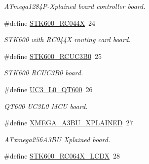 \begin{DoxyCompactItemize}
\begin{DoxyCompactList}\small\item\em A\-Tmega1284\-P-\/\-Xplained board controller board. \end{DoxyCompactList}\item 
\hypertarget{group__group__common__boards_ga53054d452a89f550fcdff65adc167f88}{\#define \hyperlink{group__group__common__boards_ga53054d452a89f550fcdff65adc167f88}{S\-T\-K600\-\_\-\-R\-C044\-X}~24}\label{group__group__common__boards_ga53054d452a89f550fcdff65adc167f88}

\begin{DoxyCompactList}\small\item\em S\-T\-K600 with R\-C044\-X routing card board. \end{DoxyCompactList}\item 
\hypertarget{group__group__common__boards_ga6bdfe50597188fd8a4956c247ecf9fa9}{\#define \hyperlink{group__group__common__boards_ga6bdfe50597188fd8a4956c247ecf9fa9}{S\-T\-K600\-\_\-\-R\-C\-U\-C3\-B0}~25}\label{group__group__common__boards_ga6bdfe50597188fd8a4956c247ecf9fa9}

\begin{DoxyCompactList}\small\item\em S\-T\-K600 R\-C\-U\-C3\-B0 board. \end{DoxyCompactList}\item 
\hypertarget{group__group__common__boards_gae06980d7c2c8a89eab699394bfb52897}{\#define \hyperlink{group__group__common__boards_gae06980d7c2c8a89eab699394bfb52897}{U\-C3\-\_\-\-L0\-\_\-\-Q\-T600}~26}\label{group__group__common__boards_gae06980d7c2c8a89eab699394bfb52897}

\begin{DoxyCompactList}\small\item\em Q\-T600 U\-C3\-L0 M\-C\-U board. \end{DoxyCompactList}\item 
\hypertarget{group__group__common__boards_ga6bc10dae84bde15597ba87e803e6f476}{\#define \hyperlink{group__group__common__boards_ga6bc10dae84bde15597ba87e803e6f476}{X\-M\-E\-G\-A\-\_\-\-A3\-B\-U\-\_\-\-X\-P\-L\-A\-I\-N\-E\-D}~27}\label{group__group__common__boards_ga6bc10dae84bde15597ba87e803e6f476}

\begin{DoxyCompactList}\small\item\em A\-Txmega256\-A3\-B\-U Xplained board. \end{DoxyCompactList}\item 
\hypertarget{group__group__common__boards_gae7749288a3bd2be20b0283233af4df79}{\#define \hyperlink{group__group__common__boards_gae7749288a3bd2be20b0283233af4df79}{S\-T\-K600\-\_\-\-R\-C064\-X\-\_\-\-L\-C\-D\-X}~28}\label{group__group__common__boards_gae7749288a3bd2be20b0283233af4df79}


\end{DoxyCompactItemize}
